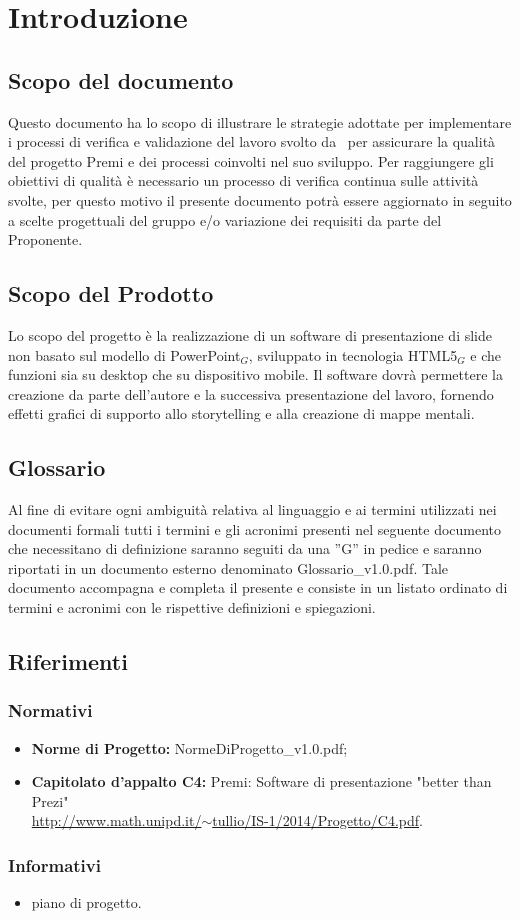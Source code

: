 \section{Introduzione}

\subsection{Scopo del documento}
Questo documento ha lo scopo di illustrare le strategie adottate per implementare i processi di verifica e validazione del lavoro svolto da \gruppo\ per assicurare la qualità del progetto Premi e dei processi coinvolti nel suo sviluppo. Per raggiungere gli obiettivi di qualità è necessario un processo di verifica continua sulle attività svolte, per questo motivo il presente documento potrà essere aggiornato in seguito a scelte progettuali del gruppo e/o variazione dei requisiti da parte del Proponente.

\subsection{Scopo del Prodotto}
Lo scopo del progetto è la realizzazione di un software di presentazione di slide non basato sul modello di PowerPoint$_{G}$, sviluppato in tecnologia HTML5$_{G}$ e che funzioni sia su desktop che su dispositivo mobile. Il software dovrà permettere la creazione da parte dell'autore e la successiva presentazione del lavoro, fornendo effetti grafici di supporto allo storytelling e alla creazione di mappe mentali.

\subsection{Glossario}
Al fine di evitare ogni ambiguità relativa al linguaggio e ai termini utilizzati nei documenti formali tutti i termini e gli acronimi presenti nel seguente documento che necessitano di definizione saranno seguiti da una ”G” in pedice e saranno riportati in un documento esterno denominato Glossario\_v1.0.pdf. Tale documento accompagna e completa il presente e consiste in un listato ordinato di termini e acronimi con le rispettive definizioni e spiegazioni.

\subsection{Riferimenti}
\subsubsection{Normativi}
\begin{itemize}
	\item \textbf{Norme di Progetto:} NormeDiProgetto\_v1.0.pdf;
	\item \textbf{Capitolato d’appalto C4:} Premi: Software di presentazione "better than Prezi"\\ \href{http://www.math.unipd.it/~tullio/IS-1/2014/Progetto/C4.pdf}{http://www.math.unipd.it/$\sim$tullio/IS-1/2014/Progetto/C4.pdf}.
\end{itemize}
\subsubsection{Informativi}
\begin{itemize}
	\item piano di progetto.
\end{itemize}